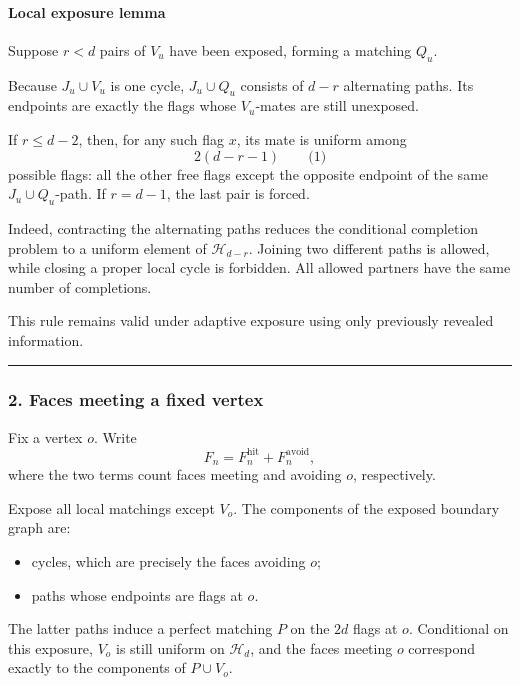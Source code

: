 \documentclass[
  11pt,
  a4paper,
]{article}
\providecommand{\tightlist}{%
  \setlength{\itemsep}{0pt}\setlength{\parskip}{0pt}}
\begin{document}
\paragraph{Local exposure lemma}\label{local-exposure-lemma}

Suppose \(r<d\) pairs of \(V_u\) have been exposed, forming a matching
\(Q_u\).

Because \(J_u\cup V_u\) is one cycle, \(J_u\cup Q_u\) consists of
\(d-r\) alternating paths. Its endpoints are exactly the flags whose
\(V_u\)-mates are still unexposed.

If \(r\le d-2\), then, for any such flag \(x\), its mate is uniform
among \[
2(d-r-1)
\qquad\text{(1)}
\] possible flags: all the other free flags except the opposite endpoint
of the same \(J_u\cup Q_u\)-path. If \(r=d-1\), the last pair is forced.

Indeed, contracting the alternating paths reduces the conditional
completion problem to a uniform element of \(\mathcal H_{d-r}\). Joining
two different paths is allowed, while closing a proper local cycle is
forbidden. All allowed partners have the same number of completions.

This rule remains valid under adaptive exposure using only previously
revealed information.

\begin{center}\rule{0.5\linewidth}{0.5pt}\end{center}

\subsubsection{2. Faces meeting a fixed
vertex}\label{faces-meeting-a-fixed-vertex}

Fix a vertex \(o\). Write \[
F_n=F_n^{\mathrm{hit}}+F_n^{\mathrm{avoid}},
\] where the two terms count faces meeting and avoiding \(o\),
respectively.

Expose all local matchings except \(V_o\). The components of the exposed
boundary graph are:

\begin{itemize}
\tightlist
\item
  cycles, which are precisely the faces avoiding \(o\);
\item
  paths whose endpoints are flags at \(o\).
\end{itemize}

The latter paths induce a perfect matching \(P\) on the \(2d\) flags at
\(o\). Conditional on this exposure, \(V_o\) is still uniform on
\(\mathcal H_d\), and the faces meeting \(o\) correspond exactly to the
components of \(P\cup V_o\).
\end{document}
